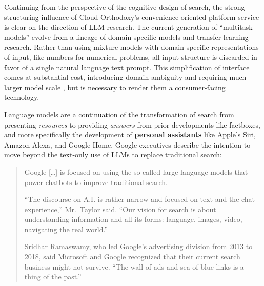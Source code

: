 Continuing from the perspective of the cognitive design of search, the
strong structuring influence of Cloud Orthodoxy's convenience-oriented
platform service is clear on the direction of LLM research. The current
generation of ``multitask models'' evolve from a lineage of
domain-specific models and transfer learning research. Rather than using
mixture models with domain-specific representations of input, like
numbers for numerical problems, all input structure is discarded in
favor of a single natural language text prompt. This simplification of
interface comes at substantial cost, introducing domain ambiguity and
requiring much larger model scale \cite{raffelExploringLimitsTransfer2020} , but is necessary to render them
a consumer-facing technology.

Language models are a continuation of the transformation of search from
presenting \emph{resources} to providing \emph{answers} from prior
developments like factboxes, and more specifically the development of
\textbf{personal assistants} like Apple's Siri, Amazon Alexa, and Google Home.
Google executives describe the intention to move beyond the text-only
use of LLMs to replace traditional search:

\begin{quote}
Google {[}\ldots{]} is focused on using the so-called large language
models that power chatbots to improve traditional search.

``The discourse on A.I. is rather narrow and focused on text and the
chat experience,'' Mr.~Taylor said. ``Our vision for search is about
understanding information and all its forms: language, images, video,
navigating the real world.''

Sridhar Ramaswamy, who led Google's advertising division from 2013 to
2018, said Microsoft and Google recognized that their current search
business might not survive. ``The wall of ads and sea of blue links is a
thing of the past.'' \cite{mickleChatbotsAreHere2023} 
\end{quote}

